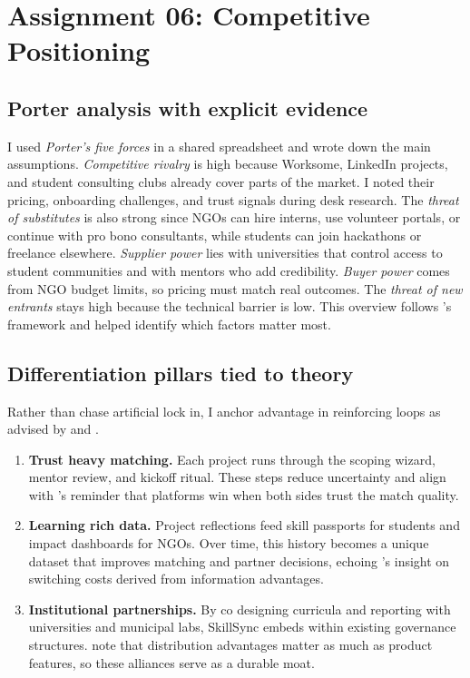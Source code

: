 \section*{Assignment 06: Competitive Positioning}

\subsection*{Porter analysis with explicit evidence}

I used \textit{Porter’s five forces} in a shared spreadsheet and wrote down the main assumptions. \textit{Competitive rivalry} is high because Worksome, LinkedIn projects, and student consulting clubs already cover parts of the market. I noted their pricing, onboarding challenges, and trust signals during desk research. The \textit{threat of substitutes} is also strong since NGOs can hire interns, use volunteer portals, or continue with pro bono consultants, while students can join hackathons or freelance elsewhere. \textit{Supplier power} lies with universities that control access to student communities and with mentors who add credibility. \textit{Buyer power} comes from NGO budget limits, so pricing must match real outcomes. The \textit{threat of new entrants} stays high because the technical barrier is low. This overview follows \citet{Porter2008}'s framework and helped identify which factors matter most.

\subsection*{Differentiation pillars tied to theory}
Rather than chase artificial lock in, I anchor advantage in reinforcing loops as advised by \citet{Choudary2016} and \citet{Reillier2017}.
\begin{enumerate}
  \item \textbf{Trust heavy matching.} Each project runs through the scoping wizard, mentor review, and kickoff ritual. These steps reduce uncertainty and align with \citet{HagiuWright2013}'s reminder that platforms win when both sides trust the match quality.
  \item \textbf{Learning rich data.} Project reflections feed skill passports for students and impact dashboards for NGOs. Over time, this history becomes a unique dataset that improves matching and partner decisions, echoing \citet{FarrellSaloner1986}'s insight on switching costs derived from information advantages.
  \item \textbf{Institutional partnerships.} By co designing curricula and reporting with universities and municipal labs, SkillSync embeds within existing governance structures. \citet{ShapiroVarian1999} note that distribution advantages matter as much as product features, so these alliances serve as a durable moat.
\end{enumerate}

